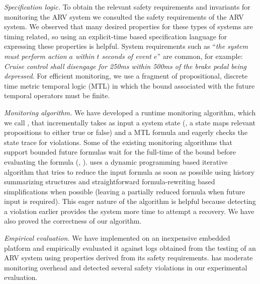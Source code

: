 \textit{Specification logic.}
To obtain the relevant safety requirements and invariants for monitoring the ARV system we consulted the safety requirements of the ARV system. 
We observed that many desired properties for these types of systems are timing related, so using an explicit-time based specification language for expressing these properties is helpful. 
System requirements such as ``\emph{the system must perform action $a$ within $t$ seconds of event $e$}'' are common, 
%
for example: \emph{Cruise control shall disengage for 250ms within 500ms of the brake pedal being depressed}.
%
For efficient monitoring, we use a fragment of propositional, discrete time metric temporal logic (MTL)\cite{Koymans1990} in which the bound associated with the future temporal operators must be finite. %

\textit{Monitoring algorithm.}
We have developed a runtime monitoring algorithm, which we call \monitor, that incrementally takes as input a system state (\ie, a state maps relevant propositions to either true or false) and a MTL formula and eagerly checks the state trace for violations. 
Some of the existing monitoring algorithms that support bounded future formulas wait for the full-time of the bound before evaluating the formula (\eg, \cite{Basin2008}). 
\monitor uses a dynamic programming based iterative algorithm that tries to reduce the input formula as soon as possible using history summarizing structures and straightforward formula-rewriting based simplifications when possible (leaving a partially reduced formula when future input is required).
This eager nature of the algorithm is helpful because detecting a violation earlier provides the system more time to attempt a recovery. We have also proved the correctness of our algorithm. 

\textit{Empirical evaluation.} 
We have implemented \monitor on an inexpensive embedded platform and empirically evaluated it against logs obtained from the testing of an ARV system using properties derived from its safety requirements.
\monitor has moderate monitoring overhead and detected several safety violations in our experimental evaluation.  





